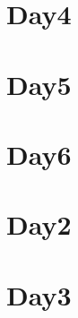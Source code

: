 
\section*{Day4}

\vfill
\section*{Day5}

\vfill
\section*{Day6}

\vfill
\section*{Day2}

\vfill
\section*{Day3}

\vfill
